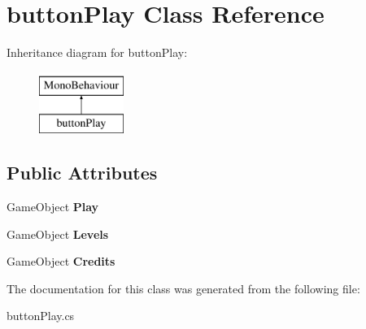 \hypertarget{classbutton_play}{}\section{button\+Play Class Reference}
\label{classbutton_play}
Inheritance diagram for button\+Play\+:\begin{figure}[H]
\begin{center}
\leavevmode
\includegraphics[height=2.000000cm]{classbutton_play}
\end{center}
\end{figure}
\subsection*{Public Attributes}
\begin{DoxyCompactItemize}
\item 
\hypertarget{classbutton_play_a03701ef5298febd01be36db9deda4529}{}Game\+Object {\bfseries Play}\label{classbutton_play_a03701ef5298febd01be36db9deda4529}

\item 
\hypertarget{classbutton_play_ac0f36b557664e8684cd2dac89ae522ae}{}Game\+Object {\bfseries Levels}\label{classbutton_play_ac0f36b557664e8684cd2dac89ae522ae}

\item 
\hypertarget{classbutton_play_aebcf3ac5bb08658d870e6b8e2e60f24a}{}Game\+Object {\bfseries Credits}\label{classbutton_play_aebcf3ac5bb08658d870e6b8e2e60f24a}

\end{DoxyCompactItemize}


The documentation for this class was generated from the following file\+:\begin{DoxyCompactItemize}
\item 
button\+Play.\+cs\end{DoxyCompactItemize}
